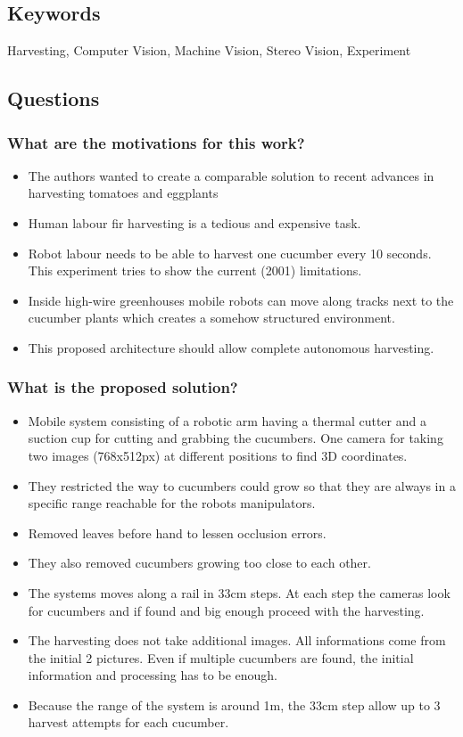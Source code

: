 \documentclass{article}
\begin{document}
\subsection*{Keywords} Harvesting, Computer Vision, Machine Vision, Stereo Vision, Experiment

\subsection*{Questions}
\subsubsection*{What are the motivations for this work?}

\begin{itemize}
    \item The authors wanted to create a comparable solution to recent advances in harvesting tomatoes and eggplants
    \item Human labour fir harvesting is a tedious and expensive task.
    \item Robot labour needs to be able to harvest one cucumber every 10 seconds. This experiment tries to show the current (2001) limitations.
    \item Inside high-wire greenhouses mobile robots can move along tracks next to the cucumber plants which creates a somehow structured environment.
    \item This proposed architecture should allow complete autonomous harvesting.
\end{itemize}
\subsubsection*{What is the proposed solution?}
\begin{itemize}
    \item Mobile system consisting of a robotic arm having a thermal cutter and a suction cup for cutting and grabbing the cucumbers. One camera for taking two
    images (768x512px) at different positions to find 3D coordinates.
    \item They restricted the way to cucumbers could grow so that they are always in a specific range reachable for the robots manipulators.
    \item Removed leaves before hand to lessen occlusion errors.
    \item They also removed cucumbers growing too close to each other.
    \item The systems moves along a rail in 33cm steps. At each step the cameras look for cucumbers and if found and big enough proceed with the harvesting.
    \item The harvesting does not take additional images. All informations come from the initial 2 pictures. Even if multiple cucumbers are found, the initial information and processing has to be enough.
    \item Because the range of the system is around 1m, the 33cm step allow up to 3 harvest attempts for each cucumber.
\end{itemize}
\end{document}
